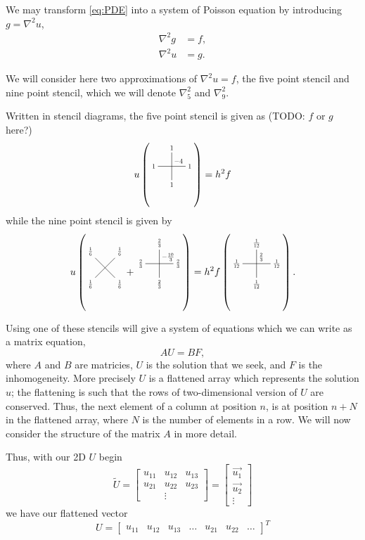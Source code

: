 
We may transform \eqref{eq:PDE} into a system of Poisson equation by introducing $g = \nabla^2 u$,
\begin{align}\label{eq:PDE-poisson}
  \nabla^2g &= f,\\
  \nabla^2u &= g.
\end{align}


We will consider here two approximations of $\nabla^2 u = f$, the five point stencil and nine point stencil, which we will denote $\nabla_5^2$ and $\nabla_9^2$.

\newcommand{\crossStencil}[5]{%
  \begin{tikzpicture}[scale=0.5,baseline=1mm, every node/.style={scale=0.7}]
    \draw node[below]{$#1$} (0,0) -- (0,2) node[above]{$#2$};
    \draw (-1, 1) node[left]{$#3$} -- (1, 1) node[right]{$#4$};
    \node[above right] at (0,1) {$#5$};
  \end{tikzpicture}
}

\newcommand{\xStencil}[4]{%
  \begin{tikzpicture}[scale=0.5,baseline=1mm, every node/.style={scale=0.7}]
    \draw node[below left]{$#1$} (0,0) -- (1.41, 1.41) node[above right]{$#2$};
    \draw (0, 1.41) node[above left]{$#3$} -- (1.41, 0) node[below right]{$#4$};
  \end{tikzpicture}
}

Written in stencil diagrams, the five point stencil is given as (TODO: $f$ or $g$ here?)
$$
u \left(\crossStencil{1}{1}{1}{1}{-4}\right) = h^2 f
$$
while the nine point stencil is given by
$$
u
\left(
\xStencil{\frac16}{\frac16}{\frac16}{\frac16}
+
\crossStencil{\frac23}{\frac23}{\frac23}{\frac23}{-\frac{10}{3}}
\right)
=
h^2
f
\left(
\crossStencil{\frac1{12}}{\frac1{12}}{\frac1{12}}{\frac1{12}}{\frac23}
\right).
$$

Using one of these stencils will give a system of equations which we can write as a matrix equation,
$$
AU = BF,
$$
where $A$ and $B$ are matricies, $U$ is the solution that we seek, and $F$ is the inhomogeneity.
More precisely $U$ is a flattened array which represents the solution $u$;
the flattening is such that the rows of two-dimensional version of $U$ are conserved.
Thus, the next element of a column at position $n$, is at position $n+N$ in the flattened array, where $N$ is the number of elements in a row.
We will now consider the structure of the matrix $A$ in more detail.

Thus, with our 2D $U$ begin 
$$
\tilde{U} =
\begin{bmatrix}
  u_{11} & u_{12} & u_{13}\\
  u_{21} & u_{22} & u_{23}\\
  & \vdots
\end{bmatrix}
=
\begin{bmatrix}
  \vec{u_1}\\
  \vec{u_2}\\
  \vdots
\end{bmatrix}
$$
we have our flattened vector
$$
U =
\begin{bmatrix}
  u_{11} & u_{12} & u_{13} & \dots & u_{21} & u_{22} & \dots
\end{bmatrix}^T
$$

